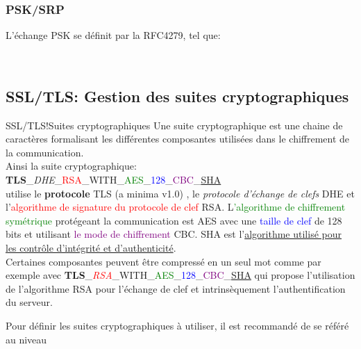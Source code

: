 \documentclass[twoside,a4paper,12pt,titlepage]{book}
\begin{document}
\subsubsection{PSK/SRP}
L'échange PSK se définit par la RFC4279, tel que:\\
 \\

\subsection{SSL/TLS: Gestion des suites cryptographiques}
\begin{Define}{SSL/TLS!Suites cryptographiques}
Une suite cryptographique est une chaine de caractères formalisant les différentes composantes utilisées dans le chiffrement de la communication.\\
Ainsi la suite cryptographique:\\
\indent\textbf{TLS}\_\textit{DHE}\_\textcolor{red}{RSA}\_WITH\_\textcolor{Green}{AES}\_\textcolor{blue}{128}\_\textcolor{Purple}{CBC}\_\underline{SHA}\\
utilise le \textbf{protocole} \gls{TLS} (a minima v1.0) , le \textit{protocole d'échange de clefs} \gls{DHE} et l'\textcolor{red}{algorithme de signature du protocole de clef} \gls{RSA}. L\textcolor{Green}{'algorithme de chiffrement symétrique} protégeant la communication est AES avec une \textcolor{blue}{taille de clef} de 128 bits et utilisant \textcolor{Purple}{le mode de chiffrement} CBC. SHA est l'\underline{algorithme utilisé pour les contrôle d'intégrité et d'authenticité}.\\
Certaines composantes peuvent être compressé en un seul mot comme par exemple avec \textbf{TLS}\_\textcolor{red}{\textit{RSA}}\_WITH\_\textcolor{Green}{AES}\_\textcolor{blue}{128}\_\textcolor{Purple}{CBC}\_\underline{SHA} qui propose l'utilisation de l'algorithme RSA pour l'échange de clef et intrinsèquement l'authentification du serveur.
\end{Define}
Pour définir les suites cryptographiques à utiliser, il est recommandé de se référé au niveau
\newpage
\end{document}
